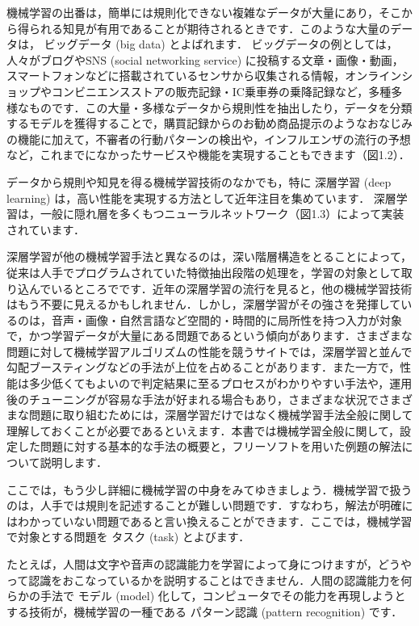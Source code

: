 
機械学習の出番は，簡単には規則化できない複雑なデータが大量にあり，そこから得られる知見が有用であることが期待されるときです．このような大量のデータは，
ビッグデータ (big data)
とよばれます．
ビッグデータの例としては，人々がブログやSNS (social networking service) に投稿する文章・画像・動画，スマートフォンなどに搭載されているセンサから収集される情報，オンラインショップやコンビニエンスストアの販売記録・IC乗車券の乗降記録など，多種多様なものです．この大量・多様なデータから規則性を抽出したり，データを分類するモデルを獲得することで，購買記録からのお勧め商品提示のようなおなじみの機能に加えて，不審者の行動パターンの検出や，インフルエンザの流行の予想など，これまでになかったサービスや機能を実現することもできます（図1.2）．


データから規則や知見を得る機械学習技術のなかでも，特に
深層学習 (deep learning)
は，高い性能を実現する方法として近年注目を集めています．
深層学習は，一般に隠れ層を多くもつニューラルネットワーク（図1.3）によって実装されています．

深層学習が他の機械学習手法と異なるのは，深い階層構造をとることによって，従来は人手でプログラムされていた特徴抽出段階の処理を，学習の対象として取り込んでいるところでです．近年の深層学習の流行を見ると，他の機械学習技術はもう不要に見えるかもしれません．しかし，深層学習がその強さを発揮しているのは，音声・画像・自然言語など空間的・時間的に局所性を持つ入力が対象で，かつ学習データが大量にある問題であるという傾向があります．さまざまな問題に対して機械学習アルゴリズムの性能を競うサイトでは，深層学習と並んで勾配ブースティングなどの手法が上位を占めることがあります．また一方で，性能は多少低くてもよいので判定結果に至るプロセスがわかりやすい手法や，運用後のチューニングが容易な手法が好まれる場合もあり，さまざまな状況でさまざまな問題に取り組むためには，深層学習だけではなく機械学習手法全般に関して理解しておくことが必要であるといえます．本書では機械学習全般に関して，設定した問題に対する基本的な手法の概要と，フリーソフトを用いた例題の解法について説明します．


ここでは，もう少し詳細に機械学習の中身をみてゆきましょう．機械学習で扱うのは，人手では規則を記述することが難しい問題です．すなわち，解法が明確にはわかっていない問題であると言い換えることができます．ここでは，機械学習で対象とする問題を
タスク (task)
とよびます．

たとえば，人間は文字や音声の認識能力を学習によって身につけますが，どうやって認識をおこなっているかを説明することはできません．人間の認識能力を何らかの手法で
モデル (model)
化して，コンピュータでその能力を再現しようとする技術が，機械学習の一種である
パターン認識 (pattern recognition) 
です．

